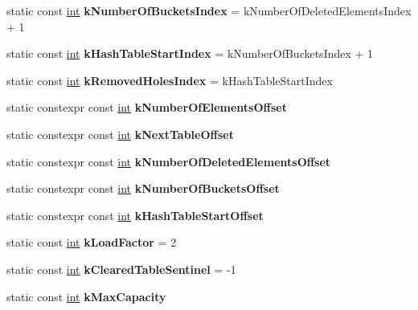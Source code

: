 \begin{DoxyCompactItemize}
static const \mbox{\hyperlink{classint}{int}} {\bfseries k\+Number\+Of\+Buckets\+Index} = k\+Number\+Of\+Deleted\+Elements\+Index + 1
\item 
\mbox{\label{classv8_1_1internal_1_1OrderedHashTable_a5ca397130613cdd977ea0ca64f31928f}} 
static const \mbox{\hyperlink{classint}{int}} {\bfseries k\+Hash\+Table\+Start\+Index} = k\+Number\+Of\+Buckets\+Index + 1
\item 
\mbox{\label{classv8_1_1internal_1_1OrderedHashTable_aeaaeebd68667bd71de04bb5795b0f354}} 
static const \mbox{\hyperlink{classint}{int}} {\bfseries k\+Removed\+Holes\+Index} = k\+Hash\+Table\+Start\+Index
\item 
static constexpr const \mbox{\hyperlink{classint}{int}} {\bfseries k\+Number\+Of\+Elements\+Offset}
\item 
static constexpr const \mbox{\hyperlink{classint}{int}} {\bfseries k\+Next\+Table\+Offset}
\item 
static constexpr const \mbox{\hyperlink{classint}{int}} {\bfseries k\+Number\+Of\+Deleted\+Elements\+Offset}
\item 
static constexpr const \mbox{\hyperlink{classint}{int}} {\bfseries k\+Number\+Of\+Buckets\+Offset}
\item 
static constexpr const \mbox{\hyperlink{classint}{int}} {\bfseries k\+Hash\+Table\+Start\+Offset}
\item 
\mbox{\label{classv8_1_1internal_1_1OrderedHashTable_aeacbdcb23dbff4326e51c908f5b026e7}} 
static const \mbox{\hyperlink{classint}{int}} {\bfseries k\+Load\+Factor} = 2
\item 
\mbox{\label{classv8_1_1internal_1_1OrderedHashTable_ad12e4c96023a1dcc176a5956782f67b9}} 
static const \mbox{\hyperlink{classint}{int}} {\bfseries k\+Cleared\+Table\+Sentinel} = -\/1
\item 
static const \mbox{\hyperlink{classint}{int}} {\bfseries k\+Max\+Capacity}
\end{DoxyCompactItemize}
